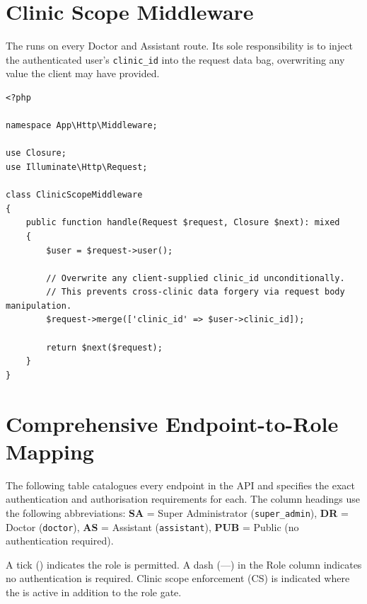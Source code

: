 \section{Clinic Scope Middleware}
\label{sec:clinic-scope-middleware}

The  runs on every Doctor and Assistant
route. Its sole responsibility is to inject the authenticated user's
\texttt{clinic\_id} into the request data bag, overwriting any value
the client may have provided.

\begin{lstlisting}[style=php, caption={\texttt{app/Http/Middleware/ClinicScopeMiddleware.php}
  --- Overwrite client-supplied clinic\_id with the authenticated
  user's authoritative value.}]
<?php

namespace App\Http\Middleware;

use Closure;
use Illuminate\Http\Request;

class ClinicScopeMiddleware
{
    public function handle(Request $request, Closure $next): mixed
    {
        $user = $request->user();

        // Overwrite any client-supplied clinic_id unconditionally.
        // This prevents cross-clinic data forgery via request body manipulation.
        $request->merge(['clinic_id' => $user->clinic_id]);

        return $next($request);
    }
}
\end{lstlisting}

\section{Comprehensive Endpoint-to-Role Mapping}
\label{sec:endpoint-role-map}

The following table catalogues every endpoint in the API and specifies
the exact authentication and authorisation requirements for each. The
column headings use the following abbreviations: \textbf{SA} = Super
Administrator (\texttt{super\_admin}), \textbf{DR} = Doctor
(\texttt{doctor}), \textbf{AS} = Assistant (\texttt{assistant}),
\textbf{PUB} = Public (no authentication required).

A tick (\checkmark) indicates the role is permitted. A dash (---) in
the Role column indicates no authentication is required. Clinic scope
enforcement (CS) is indicated where the 
is active in addition to the role gate.


